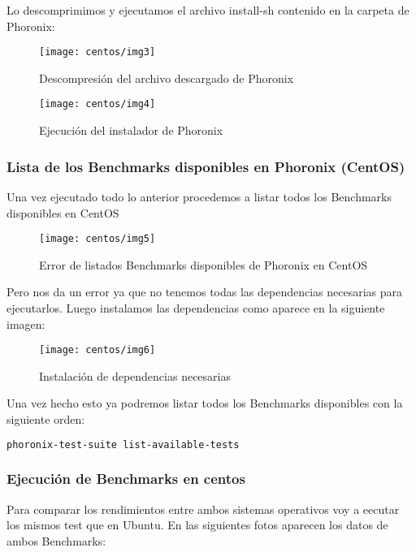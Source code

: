 \newpage
Lo descomprimimos y ejecutamos el archivo install-sh contenido en la carpeta de Phoronix:

\begin{figure}[H]
    \centering
    \texttt{[image: centos/img3]}
    \caption{Descompresión del archivo descargado de Phoronix}
\end{figure}

\begin{figure}[H]
    \centering
    \texttt{[image: centos/img4]}
    \caption{Ejecución del instalador de Phoronix}
\end{figure}

\newpage
\subsubsection{Lista de los Benchmarks disponibles en Phoronix (CentOS)}

Una vez ejecutado todo lo anterior procedemos a listar todos los Benchmarks disponibles en CentOS

\begin{figure}[H]
    \centering
    \texttt{[image: centos/img5]}
    \caption{Error de listados Benchmarks disponibles de Phoronix en CentOS}
\end{figure}

Pero nos da un error ya que no tenemos todas las dependencias necesarias para ejecutarlos. Luego instalamos las dependencias como aparece en la siguiente imagen:

\begin{figure}[H]
    \centering
    \texttt{[image: centos/img6]}
    \caption{Instalación de dependencias necesarias}
\end{figure}

Una vez hecho esto ya podremos listar todos los Benchmarks disponibles con la siguiente orden:

\begin{lstlisting}[language=bash]
    phoronix-test-suite list-available-tests
\end{lstlisting}

\newpage
\subsubsection{Ejecución de Benchmarks en centos}

Para comparar los rendimientos entre ambos sistemas operativos voy a eecutar los mismos test que en Ubuntu. En las siguientes fotos aparecen los datos de ambos Benchmarks:


